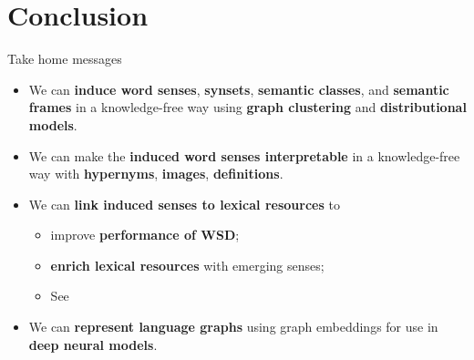 
\section{Conclusion}

%
%
%

\begin{frame}{Take home messages}

\vspace{-10pt}

\begin{itemize}
	\item We can \alert{\textbf{induce word senses}}, \alert{\textbf{synsets}}, \alert{\textbf{semantic classes}}, and \textbf{\alert{semantic frames}} in a knowledge-free way using \textbf{graph clustering} and \textbf{distributional models}.
    \vspace{1em}
    \pause
    
	\item We can make the \alert{\textbf{induced word senses interpretable}} in a knowledge-free way with \textbf{hypernyms}, \textbf{images},  \textbf{definitions}. 
	\vspace{1em}
    \pause
	
	\item We can \alert{\textbf{link induced senses to lexical resources}} to
	\begin{itemize} 
		\item improve \textbf{performance of WSD};
		\item \textbf{enrich lexical resources} with emerging senses;
		\item See~\cite{panchenko2016best,faralli2016linked,panchenko-EtAl:2017:SENSE2017,biemann2018framework}
	\end{itemize}
	
	\pause 
	\item We can \textbf{\alert{represent language graphs}} using graph embeddings for  use in \textbf{deep neural models}.
	
\end{itemize}


\end{frame}

